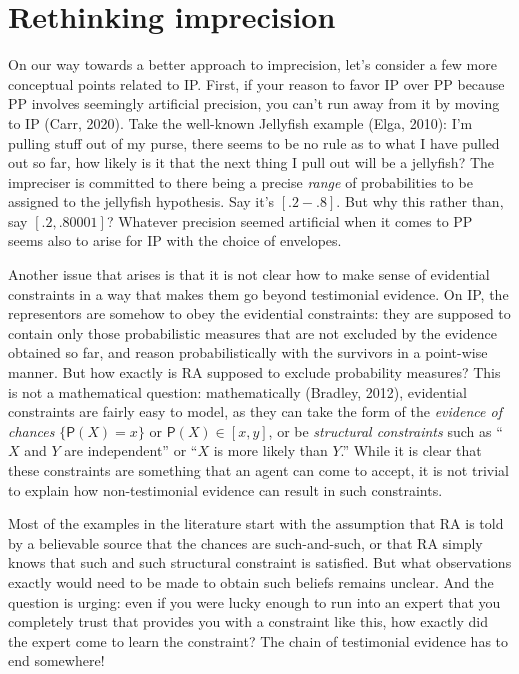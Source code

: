 \documentclass[
  10pt,
  dvipsnames,enabledeprecatedfontcommands]{scrartcl}
\begin{document}
\hypertarget{rethinking-imprecision}{%
\section{\texorpdfstring{Rethinking imprecision
\label{sec:rethinking}}{Rethinking imprecision }}\label{rethinking-imprecision}}

On our way towards a better approach to imprecision, let's consider a
few more conceptual points related to IP. First, if your reason to favor
IP over PP because PP involves seemingly artificial precision, you can't
run away from it by moving to IP (Carr, 2020). Take the well-known
Jellyfish example (Elga, 2010): I'm pulling stuff out of my purse, there
seems to be no rule as to what I have pulled out so far, how likely is
it that the next thing I pull out will be a jellyfish? The impreciser is
committed to there being a precise \emph{range} of probabilities to be
assigned to the jellyfish hypothesis. Say it's \([.2-.8]\). But why this
rather than, say \([.2,.80001]\)? Whatever precision seemed artificial
when it comes to PP seems also to arise for IP with the choice of
envelopes.

Another issue that arises is that it is not clear how to make sense of
evidential constraints in a way that makes them go beyond testimonial
evidence. On IP, the representors are somehow to obey the evidential
constraints: they are supposed to contain only those probabilistic
measures that are not excluded by the evidence obtained so far, and
reason probabilistically with the survivors in a point-wise manner. But
how exactly is RA supposed to exclude probability measures? This is not
a mathematical question: mathematically (Bradley, 2012), evidential
constraints are fairly easy to model, as they can take the form of the
\emph{evidence of chances} \(\{ \mathsf{P}(X) = x\}\) or
\(\mathsf{P}(X) \in [x,y]\), or be \emph{structural constraints} such as
``\(X\) and \(Y\) are independent'' or ``\(X\) is more likely than
\(Y\).'' While it is clear that these constraints are something that an
agent can come to accept, it is not trivial to explain how
non-testimonial evidence can result in such constraints.

Most of the examples in the literature start with the assumption that RA
is told by a believable source that the chances are such-and-such, or
that RA simply knows that such and such structural constraint is
satisfied. But what observations exactly would need to be made to obtain
such beliefs remains unclear. And the question is urging: even if you
were lucky enough to run into an expert that you completely trust that
provides you with a constraint like this, how exactly did the expert
come to learn the constraint? The chain of testimonial evidence has to
end somewhere!
\end{document}
